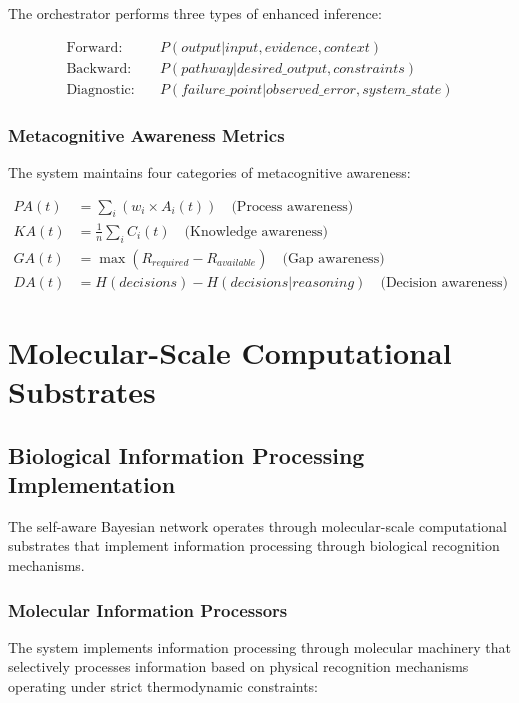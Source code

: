\documentclass[12pt,a4paper]{article}
\begin{document}
The orchestrator performs three types of enhanced inference:

\begin{align}
\text{Forward:} \quad &P(output | input, evidence, context) \\
\text{Backward:} \quad &P(pathway | desired\_output, constraints) \\
\text{Diagnostic:} \quad &P(failure\_point | observed\_error, system\_state)
\end{align}

\subsubsection{Metacognitive Awareness Metrics}

The system maintains four categories of metacognitive awareness:

\begin{align}
PA(t) &= \sum_i (w_i \times A_i(t)) \quad \text{(Process awareness)} \\
KA(t) &= \frac{1}{n} \sum_i C_i(t) \quad \text{(Knowledge awareness)} \\
GA(t) &= \max(R_{required} - R_{available}) \quad \text{(Gap awareness)} \\
DA(t) &= H(decisions) - H(decisions | reasoning) \quad \text{(Decision awareness)}
\end{align}

\section{Molecular-Scale Computational Substrates}

\subsection{Biological Information Processing Implementation}

The self-aware Bayesian network operates through molecular-scale computational substrates that implement information processing through biological recognition mechanisms.

\subsubsection{Molecular Information Processors}

The system implements information processing through molecular machinery that selectively processes information based on physical recognition mechanisms operating under strict thermodynamic constraints:
\end{document}
